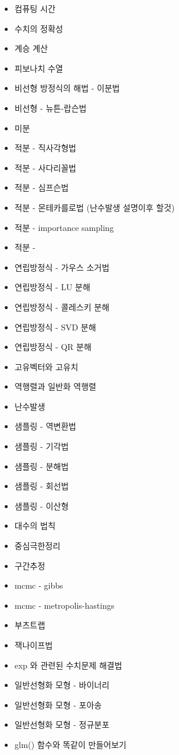 \documentclass[../tutorial.tex]{subfiles}
\begin{document}
\begin{itemize}
\item 컴퓨팅 시간
\item 수치의 정확성
\item 계승 계산 
\item 피보나치 수열 
\item 비선형 방정식의 해법 - 이분법 
\item 비선형 - 뉴튼-랍슨법 
\item 미분 
\item 적분 - 직사각형법
\item 적분 - 사다리꼴법 
\item 적분 - 심프슨법 
\item 적분 - 몬테카를로법 (난수발생 설명이후 할것)
\item 적분 - importance sampling 
\item 적분 - 
\item 연립방정식 - 가우스 소거법 
\item 연립방정식 - LU 분해 
\item 연립방정식 - 콜레스키 분해 
\item 연립방정식 - SVD 분해 
\item 연립방정식 - QR 분해 
\item 고유벡터와 고유치 
\item 역행렬과 일반화 역행렬 
\item 난수발생 
\item 샘플링 - 역변환법
\item 샘플링 - 기각법 
\item 샘플링 - 분해법 
\item 샘플링 - 회선법 
\item 샘플링 - 이산형 
\item 대수의 법칙 
\item 중심극한정리 
\item 구간추정 
\item mcmc - gibbs
\item mcmc - metropolis-hastings
\item 부츠트랩 
\item 잭나이프법 
\item exp 와 관련된 수치문제 해결법 
\item 일반선형화 모형 - 바이너리 
\item 일반선형화 모형 - 포아송 
\item 일반선형화 모형 - 정규분포 
\item glm() 함수와 똑같이 만들어보기 
\end{itemize} 
\end{document}
